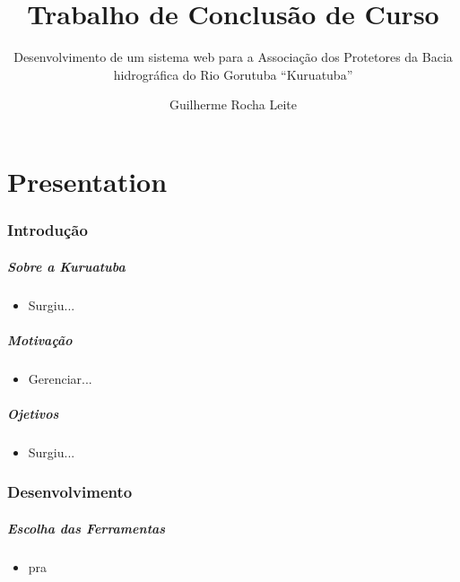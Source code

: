 \documentclass{beamer}
\title[Trabalho de Conclusão de Curso]{Trabalho de Conclusão de Curso}
\subtitle{Desenvolvimento de um sistema web para a Associação dos Protetores da Bacia hidrográfica do Rio Gorutuba ``Kuruatuba''}
\author[Guilherme Rocha Leite]{Guilherme Rocha Leite}
\institute[UFVJM]{Universidade Federal dos Vales do Jequitinhonha e Mucuri \newline
  Bacharelado em Sistemas de Informação \newline
	  
     Orientador: Prof.ª Erinaldo Barbosa da Silva\\
     Co-orientador: Thales Francisco Mota Carvalho\\
     $~$\\
}
\begin{document}
\frame{\titlepage}

\part{Presentation}




\section{Introdução}

\begin{frame}
    \frametitle{Sobre a Kuruatuba}
    \begin{itemize}
        \item Surgiu...
    \end{itemize}

\end{frame}


\begin{frame}
    \frametitle{Motivação}
    \begin{itemize}
        \item Gerenciar...
    \end{itemize}

\end{frame}


\begin{frame}
    \frametitle{Ojetivos}
    \begin{itemize}
        \item Surgiu...
    \end{itemize}
\end{frame}



\section{Desenvolvimento}
\begin{frame}
    \frametitle{Escolha das Ferramentas}
    \begin{itemize}
        \item pra 
    \end{itemize}
\end{frame}
\end{document}
